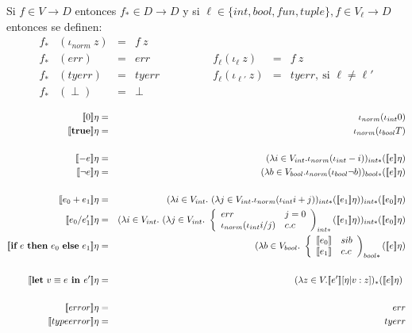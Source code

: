       \PN Si $f\in V\rightarrow D$ entonces $f_{*}\in D\rightarrow D$ y
      \PN si $\ell \in \{int, bool, fun, tuple\}, f \in V_{\ell} \rightarrow D$ entonces se definen:
      \[\begin{array}{lllllll}
        f_* & (\iota_{norm}\ z) &=& f\ z\\
        f_* & (err) &=& err & \qquad \qquad f_{\ell} (\iota_{\ell}\ z) &=& f\ z \\
        f_* & (tyerr) &=& tyerr & \qquad \qquad f_{\ell} (\iota_{\ell'}\ z) &=& tyerr, \ \text{si } \ell \neq \ell'\\
        f_* & (\perp) &=& \perp
      \end{array}\]

      \begin{eqnarray*}
        \se{0}\eta &=& \iota_{norm}(\iota_{int} 0) \\
        \se{\textbf{true}}\eta &=& \iota_{norm}(\iota_{bool} T) \\ \\
        \se{-e}\eta &=& (\lambda i \in V_{int}. \iota_{norm}(\iota_{int} -i))_{int*}(\se{e}\eta) \\
        \se{\neg e}\eta &=& (\lambda b \in V_{bool}. \iota_{norm}(\iota_{bool} \neg b))_{bool*}(\se{e}\eta) \\ \\
        \se{e_0+e_1}\eta &=& (\lambda i \in V_{int}.\ (\lambda j \in V_{int}. \iota_{norm}(\iota_{int} i+j))_{int*}(\se{e_1}\eta))_{int*}(\se{e_0}\eta) \\
        \se{e_0/e_1'}\eta &=& (\lambda i \in V_{int}. \ (\lambda j \in V_{int}. \ \left\lbrace 
        \begin{array}{lll}
          err & j = 0 \\
          \iota_{norm}(\iota_{int} i/j) & c.c
        \end{array}\right)_{int*} (\se{e_1}\eta))_{int*} (\se{e_0}\eta) \\
        \se{\IF{e}{e_0}{e_1}}\eta &=& (\lambda b \in V_{bool}. \ \left\lbrace 
        \begin{array}{lll}
          \se{e_0} & si b \\
          \se{e_1} & c.c \\
        \end{array}\right)_{bool*} (\se{e}\eta) \\ \\
        \se{\textbf{let} \ v \equiv e \textbf{ in } e'}\eta &=& (\lambda z \in V. \se{e'}[\eta | v : z])_{\ast}(\se{e}\eta) \\ \\
        \se{error}\eta &=& err \\
        \se{typeerror}\eta &=& tyerr
      \end{eqnarray*}

